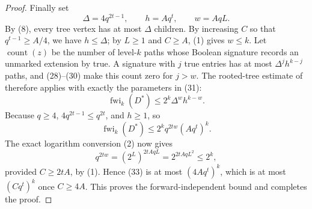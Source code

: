 \begin{proof}
Finally set
\[
 \Delta=4q^{2t-1},\qquad h=Aq^t,\qquad w=AqL.                  \tag{31}
\]
By (8), every tree vertex has at most $\Delta$ children.  By increasing
$C$ so that $q^{t-1}\geq A/4$, we have $h\leq\Delta$; by $L\geq1$ and
$C\geq A$, (1) gives $w\leq k$.  Let $\operatorname{count}(z)$ be the
number of level-$k$ paths whose Boolean signature records an unmarked
extension by true.  A signature with $j$ true entries has at most
$\Delta^j h^{k-j}$ paths, and (28)--(30) make this count zero for $j>w$.
The rooted-tree estimate of  therefore applies
with exactly the parameters in (31):
\[
 \operatorname{fwi}_k(D^*)
 \leq2^k\Delta^w h^{k-w}.                                     \tag{32}
\]
Because $q\geq4$, $4q^{2t-1}\leq q^{2t}$, and $h\geq1$, so
\[
 \operatorname{fwi}_k(D^*)
 \leq2^k q^{2tw}(Aq^t)^k.                                     \tag{33}
\]
The exact logarithm conversion (2) now gives
\[
 q^{2tw}=(2^L)^{2tAqL}=2^{2tAqL^2}\leq2^k,                   \tag{34}
\]
provided $C\geq2tA$, by (1).  Hence (33) is at most
$(4Aq^t)^k$, which is at most $(Cq^t)^k$ once $C\geq4A$.
This proves the forward-independent bound and completes the proof.
\end{proof}
